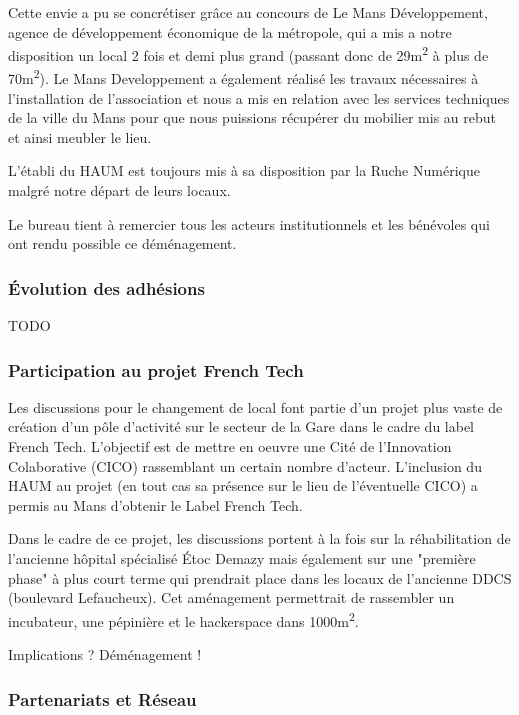 \documentclass[11pt,twosided]{article}
\begin{document}
Cette envie a pu se concrétiser grâce au concours de Le Mans Développement, agence de développement économique de la métropole, qui a mis a notre disposition un local 2 fois et demi plus grand (passant donc de 29m\textsuperscript{2} à plus de 70m\textsuperscript{2}). Le Mans Developpement a également réalisé les travaux nécessaires à l'installation de l'association et nous a mis en relation avec les services techniques de la ville du Mans pour que nous puissions récupérer du mobilier mis au rebut et ainsi meubler le lieu.

L'établi du HAUM est toujours mis à sa disposition par la Ruche Numérique malgré notre départ de leurs locaux.

Le bureau tient à remercier tous les acteurs institutionnels et les bénévoles qui ont rendu possible ce déménagement.

\subsubsection{Évolution des adhésions}

TODO

\subsubsection{Participation au projet French Tech}

Les discussions pour le changement de local font partie d'un projet plus vaste de création d'un pôle d'activité sur le secteur de la Gare dans le cadre du label French Tech. L'objectif est de mettre en oeuvre une Cité de l'Innovation Colaborative (CICO) rassemblant un certain nombre d'acteur. L'inclusion du HAUM au projet (en tout cas sa présence sur le lieu de l'éventuelle CICO) a permis au Mans d'obtenir le Label French Tech.

Dans le cadre de ce projet, les discussions portent à la fois sur la réhabilitation de l'ancienne hôpital spécialisé Étoc Demazy mais également sur une "première phase" à plus court terme qui prendrait place dans les locaux de l'ancienne DDCS (boulevard Lefaucheux). Cet aménagement permettrait de rassembler un incubateur, une pépinière et le hackerspace dans 1000m\textsuperscript{2}.

Implications ? Déménagement !

\subsubsection{Partenariats et Réseau}
\end{document}
